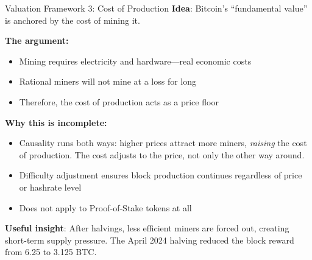 \documentclass[10pt]{beamer}
\begin{document}
\begin{frame}{Valuation Framework 3: Cost of Production}
  \textbf{Idea}: Bitcoin's ``fundamental value'' is anchored by the cost of mining it.
  
  \vspace{0.5em}
  \textbf{The argument:}
  \begin{itemize}
    \item Mining requires electricity and hardware---real economic costs
    \item Rational miners will not mine at a loss for long
    \item Therefore, the cost of production acts as a price floor
  \end{itemize}
  
  \vspace{0.5em}
  \textbf{Why this is incomplete:}
  \begin{itemize}
    \item Causality runs both ways: higher prices attract more miners, \textit{raising} the cost of production. The cost adjusts to the price, not only the other way around.
    \item Difficulty adjustment ensures block production continues regardless of price or hashrate level
    \item Does not apply to Proof-of-Stake tokens at all
  \end{itemize}
  
  \vspace{0.5em}
  \textbf{Useful insight}: After halvings, less efficient miners are forced out, creating short-term supply pressure. The April 2024 halving reduced the block reward from 6.25 to 3.125 BTC.
\end{frame}
\end{document}
